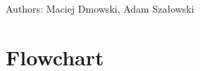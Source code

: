 Authors\+: Maciej Dmowski, Adam Szałowski \hypertarget{index_Flowchart}{}\section{Flowchart}\label{index_Flowchart}
 